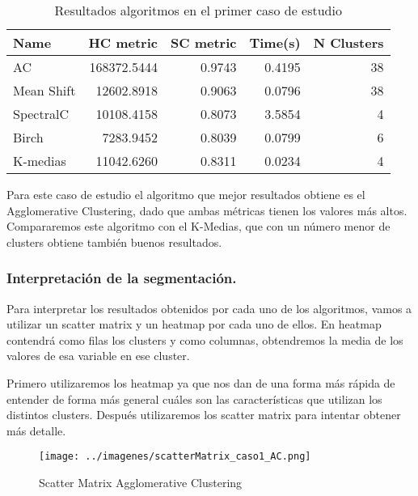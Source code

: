 	\begin{table}[H]
	\centering
		\begin{tabular}{lrrrr}
			\toprule
			Name &      HC metric &  SC metric &      Time(s) &  N Clusters \\
			\midrule
			AC         &  168372.5444 &   0.9743 &  0.4195 &          38 \\
			Mean Shift &   12602.8918 &   0.9063 &  0.0796 &          38 \\
			SpectralC  &   10108.4158 &   0.8073 &  3.5854 &           4 \\
			Birch      &    7283.9452 &   0.8039 &  0.0799 &           6 \\
			K-medias   &   11042.6260 &   0.8311 &  0.0234 &           4 \\
			\bottomrule
		\end{tabular}
	\caption{Resultados algoritmos en el primer caso de estudio}
	\label{table:res_caso1}
	\end{table}

	Para este caso de estudio el algoritmo que mejor resultados obtiene es el Agglomerative Clustering, dado que ambas métricas tienen los valores más altos. Compararemos este algoritmo con el K-Medias, que con un número menor de clusters obtiene también buenos resultados.

	\subsubsection{Interpretación de la segmentación.}
	Para interpretar los resultados obtenidos por cada uno de los algoritmos, vamos a utilizar un scatter matrix y un heatmap por cada uno de ellos. En heatmap contendrá como filas los clusters y como columnas, obtendremos la media de los valores de esa variable en ese cluster.
	
	\vspace{0.06in}
	
	Primero utilizaremos los heatmap ya que nos dan de una forma más rápida de entender de forma más general cuáles son las características que utilizan los distintos clusters. Después utilizaremos los scatter matrix para intentar obtener más detalle.
	
	\begin{figure}[H]
		\centering
		\texttt{[image: ../imagenes/scatterMatrix\_caso1\_AC.png]}
		\caption{Scatter Matrix Agglomerative Clustering}
		\label{fig:scatter_caso1_AC}
	\end{figure}


